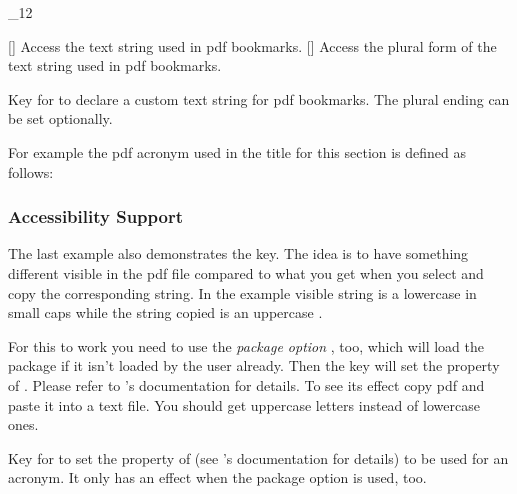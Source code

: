 \documentclass[load-preamble+]{cnltx-doc}
\makeatletter
\renewenvironment{commands}
  {%
    \cnltx@set@catcode_{12}%
    \let\command\cnltx@command
    \cnltxlist
  }
  {\endcnltxlist}
\makeatother
\begin{document}
\begin{commands}
  \command{acpdfstring}[]
    Access the text string used in \acs{pdf} bookmarks.
  \command{acpdfstringplural}[]
    Access the plural form of the text string used in \acs{pdf} bookmarks.
\end{commands}
\begin{options}
    Key for  to declare a custom text string for \acs{pdf}
    bookmarks.  The plural ending can be set optionally.
\end{options}

For example the \acs{pdf} acronym used in the title for this section is defined
as follows:
\begin{sourcecode}
\end{sourcecode}

\subsubsection{Accessibility Support}

The last example also demonstrates the  key.  The idea is to
have something different visible in the \acs{pdf} file compared to what you
get when you select and copy the corresponding string.  In the example visible
string is a lowercase  in small caps while the string copied is an
uppercase .

For this to work you need to use the \emph{package option} ,
too, which will load the package  if it isn't loaded by the user
already.  Then the key  will set the 
property of .  Please refer to 's documentation
for details.  To see its effect copy \ac{pdf} and paste it into a text file.
You should get uppercase letters instead of lowercase ones.

\begin{options}
    Key for  to set the 
    property of  (see 's documentation for
    details) to be used for an acronym.  It only has an effect when the
    package option  is used, too.
\end{options}
\end{document}

